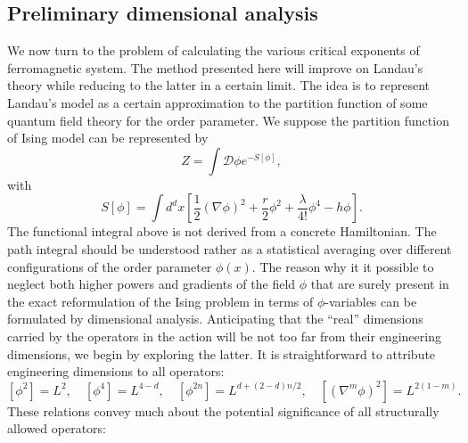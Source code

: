 \subsection{Preliminary dimensional analysis}
We now turn to the problem of calculating the various critical exponents of ferromagnetic system. The method presented here will improve on Landau's theory while reducing to the latter in a certain limit. The idea is to represent Landau's model as a certain approximation to the partition function of some quantum field theory for the order parameter. 
We suppose the partition function of Ising model can be represented by
\[Z = \int \mathcal{D}\phi e^{-S[\phi]},\]
with 
\[S[\phi] = \int d^d x \left[\frac{1}{2}(\nabla \phi)^2 + \frac{r}{2}\phi^2 + \frac{\lambda}{4!}\phi^4 - h\phi \right].\]
The functional integral above is not derived from a concrete Hamiltonian. The path integral should be understood rather as a statistical averaging over different configurations of the order parameter $\phi(x)$. 
The reason why it it possible to neglect both higher powers and gradients of the field $\phi$ that are surely present in the exact reformulation of the Ising problem in terms of $\phi$-variables can be formulated by dimensional analysis.
Anticipating that the ``real'' dimensions carried by the operators in the action will be not too far from their
engineering dimensions, we begin by exploring the latter. 
It is straightforward to attribute engineering dimensions to all operators:
\[\left[\phi^2 \right] = L^2 , \quad \left[\phi^4 \right] = L^{4-d} , \quad \left[\phi^{2n} \right] = L^{d + (2-d)n/2} , \quad  \left[(\nabla^m \phi)^2 \right] = L^{2(1-m)}.\]
These relations convey much about the potential significance of all structurally allowed operators:
